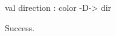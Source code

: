 \chklistingtrue
{}
\begin{ChkListingMsg}
val direction : color -D-> dir
\end{ChkListingMsg}
\begin{ChkListingErr}
Success.
\end{ChkListingErr}
